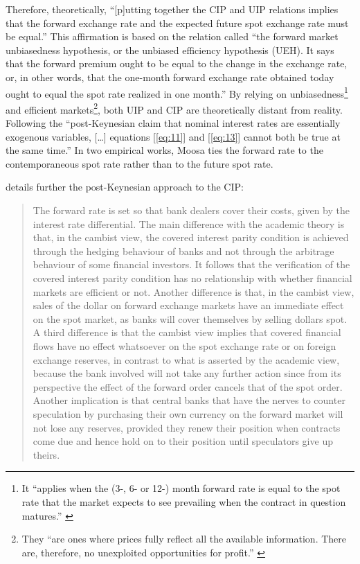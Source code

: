 \documentclass[a4paper, twoside]{templates/ociamthesis}
\begin{document}
Therefore, theoretically, ``{[}p{]}utting together the CIP and UIP relations implies that the forward exchange rate and the expected future spot exchange rate must be equal.'' \autocite[ 164]{lavoie2000} This affirmation is based on the relation called ``the forward market unbiasedness hypothesis, or the unbiased efficiency hypothesis (UEH). It says that the forward premium ought to be equal to the change in the exchange rate, or, in other words, that the one-month forward exchange rate obtained today ought to equal the spot rate realized in one month.'' \autocite[ 479]{lavoie2014} By relying on unbiasedness\footnote{It ``applies when the (3-, 6- or 12-) month forward rate is equal to the spot rate that the market expects to see prevailing when the contract in question matures.'' \autocite[ 100]{copeland2014}} and efficient markets\footnote{They ``are ones where prices fully reflect all the available information. There are, therefore, no unexploited opportunities for profit.'' \autocite[ 101]{copeland2014}}, both UIP and CIP are theoretically distant from reality. Following the ``post-Keynesian claim that nominal interest rates are essentially exogenous variables, {[}\ldots{]} equations {[}\eqref{eq:11}{]} and {[}\eqref{eq:13}{]} cannot both be true at the same time.'' \autocite[ 479]{lavoie2014} In two empirical works, Moosa \autocite*{moosa2004,moosa2015} ties the forward rate to the contemporaneous spot rate rather than to the future spot rate.

\textcite[ 20-21]{lavoie2021} details further the post-Keynesian approach to the CIP:

\begin{quote}
The forward rate is set so that bank dealers cover their costs, given by the interest rate differential. The main difference with the academic theory is that, in the cambist view, the covered interest parity condition is achieved through the hedging behaviour of banks and not through the arbitrage behaviour of some financial investors. It follows that the verification of the covered interest parity condition has no relationship with whether financial markets are efficient or not. Another difference is that, in the cambist view, sales of the dollar on forward exchange markets have an immediate effect on the spot market, as banks will cover themselves by selling dollars spot. A third difference is that the cambist view implies that covered financial flows have no effect whatsoever on the spot exchange rate or on foreign exchange reserves, in contrast to what is asserted by the academic view, because the bank involved will not take any further action since from its perspective the effect of the forward order cancels that of the spot order. Another implication is that central banks that have the nerves to counter speculation by purchasing their own currency on the forward market will not lose any reserves, provided they renew their position when contracts come due and hence hold on to their position until speculators give up theirs.
\end{quote}
\end{document}
